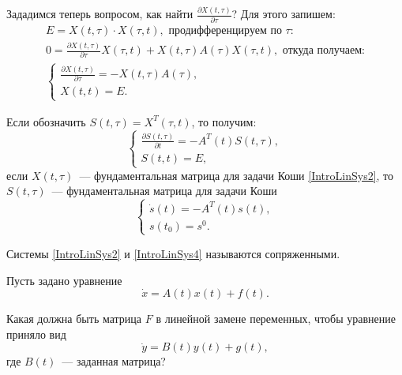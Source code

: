 Зададимся теперь вопросом,
как найти $\frac{\partial{X}(t, \tau)}{\partial{\tau}}$?
Для этого запишем:
\begin{gather*}
  E = X(t, \tau) \cdot X(\tau, t),\text{ продифференцируем по } \tau:\\
  0 = \frac{\partial{X}(t, \tau)}{\partial{\tau}} X(\tau, t) +
      X(t, \tau) A(\tau) X(\tau, t),\text{ откуда получаем:}\\
  \begin{cases}
    \frac{\partial{X}(t, \tau)}{\partial{\tau}} = -X(t, \tau) A(\tau),\\
    X(t, t) = E.
  \end{cases}
\end{gather*}

Если обозначить $S(t, \tau) = X^{T}(\tau, t)$, то получим:
\begin{equation*}
  \begin{cases}
    \frac{\partial{S}(t, \tau)}{\partial{t}} = -A^{T}(t) S(t, \tau),\\
    S(t, t) = E,
  \end{cases}
\end{equation*}
если $X(t, \tau)$~--- фундаментальная матрица
для задачи Коши \eqref{IntroLinSys2},
то $S(t, \tau)$~--- фундаментальная матрица для задачи Коши
\begin{equation}
\label{IntroLinSys4}
  \begin{cases}
    \dot{s}(t) = -A^{T}(t) s(t),\\
    s(t_{0}) = s^{0}.
  \end{cases}
\end{equation}

Системы \eqref{IntroLinSys2} и \eqref{IntroLinSys4}
называются сопряженными.

\begin{problem}
  Пусть задано уравнение
  \begin{equation*}
    \dot{x} = A(t) x(t) + f(t).
  \end{equation*}
  
  Какая должна быть матрица $F$ в линейной
  замене переменных, чтобы уравнение приняло вид
  \begin{equation*}
    \dot{y} = B(t)y(t) + g(t),
  \end{equation*}
  где $B(t)$~--- заданная матрица?
\end{problem}

